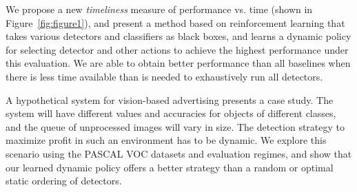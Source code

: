 We propose a new \emph{timeliness} measure of performance vs. time (shown in Figure~\ref{fig:figure1}), and present a method based on reinforcement learning that takes various detectors and classifiers as black boxes, and learns a dynamic policy for selecting detector and other actions to achieve the highest performance under this evaluation.
We are able to obtain better performance than all baselines when there is less time available than is needed to exhaustively run all detectors.

A hypothetical system for vision-based advertising presents a case study.
The system will have different values and accuracies for objects of different classes, and the queue of unprocessed images will vary in size.
The detection strategy to maximize profit in such an environment has to be dynamic.
We explore this scenario using the PASCAL VOC datasets and evaluation regimes, and show that our learned dynamic policy offers a better strategy than a random or optimal static ordering of detectors.
